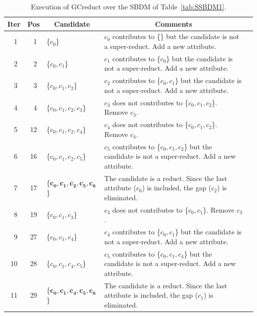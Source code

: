 \documentclass[number,preprint,review,12pt]{elsarticle}
\begin{document}
	\begin{table}[!htb]
		\caption{Execution of GCreduct over the SBDM of Table~\ref{tab:SSBDM1}.}\label{tab:sample_GCreduct}
		\centering \scriptsize
		\begin{tabular}{|c|c|l|l|l|}
			\hline
			Iter & Pos & \multicolumn{1}{c|}{Candidate} & \multicolumn{1}{c|}{Comments}\\
			\hline
			~1 & ~1 & \{$c_0$\} 			    & \multicolumn{1}{p{8.5cm}|}{$c_0$ contributes to \{\} but the candidate is not a super-reduct. Add a new attribute.}\\
					\hline
			~2 & ~2 & \{$c_0,c_1$\}				& \multicolumn{1}{p{8.5cm}|}{$c_1$ contributes to \{$c_0$\} but the candidate is not a super-reduct. Add a new attribute.}\\
					\hline
			~3 & ~3 & \{$c_0,c_1,c_2$\}			& \multicolumn{1}{p{8.5cm}|}{$c_2$ contributes to \{$c_0,c_1$\} but the candidate is not a super-reduct. Add a new attribute.}\\
					\hline				
			~4 & ~4 & \{$c_0,c_1,c_2,c_3$\}		& \multicolumn{1}{p{8.5cm}|}{$c_3$ does not contributes to \{$c_0,c_1,c_2$\}. Remove $c_3$.}\\
					\hline
			~5 & 12 & \{$c_0,c_1,c_2,c_4$\}		& \multicolumn{1}{p{8.5cm}|}{$c_4$ does not contributes to \{$c_0,c_1,c_2$\}. Remove $c_4$.}\\
					\hline
			~6 & 16 & \{$c_0,c_1,c_2,c_5$\}		& \multicolumn{1}{p{8.5cm}|}{$c_5$ contributes to \{$c_0,c_1,c_2$\} but the candidate is not a super-reduct. Add a new attribute.}\\
					\hline
			~7 & 17 & \{$\mathbf{c_0,c_1,c_2,c_5,c_6}$\} & \multicolumn{1}{p{8.5cm}|}{The candidate is a reduct. Since the last attribute ($c_6$) is included, the gap ($c_2$) is eliminated.}\\
					\hline
			~8 & 19 & \{$c_0,c_1,c_3$\}			& \multicolumn{1}{p{8.5cm}|}{$c_3$ does not contributes to \{$c_0,c_1$\}. Remove $c_3$.}\\
					\hline
			~9 & 27 & \{$c_0,c_1,c_4$\}			& \multicolumn{1}{p{8.5cm}|}{$c_4$ contributes to \{$c_0,c_1$\} but the candidate is not a super-reduct. Add a new attribute.}\\
					\hline
			10 & 28 & \{$c_0,c_1,c_4,c_5$\}		& \multicolumn{1}{p{8.5cm}|}{$c_5$ contributes to \{$c_0,c_1,c_4$\} but the candidate is not a super-reduct. Add a new attribute.}\\
					\hline
			11 & 29 & \{$\mathbf{c_0,c_1,c_4,c_5,c_6}$\} & \multicolumn{1}{p{8.5cm}|}{The candidate is a reduct. Since the last attribute is included, the gap ($c_1$) is eliminated.}\\

\end{tabular}
\end{table}
\end{document}
